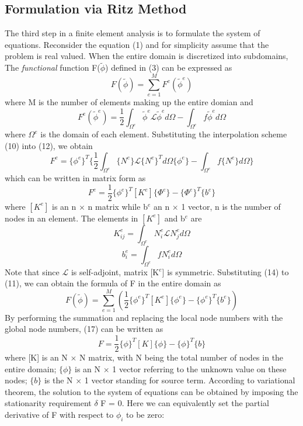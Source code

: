 \documentclass[journal]{IEEEtran}
\begin{document}
\subsection{Formulation via Ritz Method}
The third step in a finite element analysis is to formulate the system of equations. Reconsider the equation (1) and for simplicity assume that the problem is real valued. When the entire domain is discretized into subdomains, The \textit{functional} function F(${\widetilde{\phi}}$) defined in (3) can be expressed as
\begin{equation}
F(\widetilde{\phi}) = \sum_{e=1}^{M} F^e(\widetilde{\phi}^e) 
\end{equation}
where M is the number of elements making up the entire domian and
\begin{equation}
F^e(\widetilde{\phi}^e) = \frac{1}{2} \int_{\Omega^e} \widetilde{\phi}^e \mathcal{L} \widetilde{\phi}^e d\Omega -\int_{\Omega^e} f \widetilde{\phi}^e d\Omega
\end{equation}
where ${{\Omega^e}}$ is the domain of each element. Substituting the interpolation scheme (10) into (12), we obtain
\begin{equation}
F^e =  \{\phi^e\}^T \{\frac{1}{2} \int_{\Omega^e}\{N^e\}\mathcal{L}\{N^e\}^Td{\Omega}\{\phi^e\} - \int_{\Omega^e}f\{N^e\}d{\Omega}\}
\end{equation}
which can be written in matrix form as 
\begin{equation}
F^e = \frac{1}{2} \{\phi^e\}^T[K^e]\{\Phi^e\} - \{\Phi^e\}^T\{b^e\}
\end{equation}
where ${[K^e]}$ is an n ${\times}$ n matrix while {b$^e$} an n  ${\times}$ 1 vector, n is the number of nodes in an element. The elements in ${[K^e]}$ and {b$^e$} are
\begin{equation}
K^e_{ij} = \int_{\Omega^e}N^e_i \mathcal{L}N^e_j d\Omega
\end{equation}
\begin{equation}
b^e_i = \int_{\Omega^e}fN^e_i d\Omega
\end{equation}
Note that since ${\mathcal{L}}$ is self-adjoint, matrix [K$^e$] is symmetric. Substituting (14) to (11), we can obtain the formula of F in the entire domain as
\begin{equation}
F(\widetilde{\phi}) = \sum_{e=1}^{M} (\frac{1}{2}\{\phi^e\}^T[K^e]\{\phi^e\} - \{\phi^e\}^T\{b^e\})
\end{equation}
By performing the summation and replacing the local node numbers with the global node numbers, (17) can be written as
\begin{equation}
F = \frac{1}{2}\{\phi\}^T[K]\{\phi\}-\{\phi\}^T\{b\}
\end{equation}
where [K] is an N ${\times}$ N matrix, with N being the total number of nodes in the entire domain; ${\{\phi\}}$ is an N ${\times}$ 1 vector referring to the unknown value on these nodes;  ${\{b\}}$ is the N ${\times}$ 1 vector standing for source term.  
According to variational theorem, the solution to the system of equations can be obtained by imposing the stationarity requirement $\delta$ F = 0. Here we can equivalently set the partial derivative of F with respect to $\phi_i$ to be zero:
\end{document}
